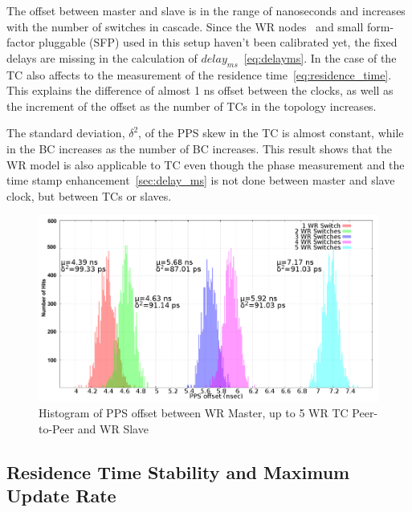 %
The offset between master and slave is in the range of nanoseconds and
increases with the number of switches in cascade. Since the WR nodes~\cite{biblio:wr_gsi} 
and small form-factor pluggable (SFP) used in this setup haven't been calibrated yet, 
the fixed delays are missing in the
calculation of $delay_{ms}$~\eqref{eq:delayms}. In the case of the TC also
affects to the measurement of the residence time~\eqref{eq:residence_time}. This
explains the difference of almost 1 ns offset between the clocks, as well as
the increment of the offset as the number of TCs in the topology increases.

The standard deviation, $\delta^2$, of the PPS skew in the TC is almost constant, 
while in the BC increases as the number of BC increases. 
This result shows that the WR model is also applicable to TC even though the
phase measurement and the time stamp enhancement~\ref{sec:delay_ms} is not done between master and
slave clock, but between TCs or slaves. 

\FloatBarrier
\begin{figure}[!t]
\centering
\includegraphics[scale=0.29]{fig/p2p.png}
\caption{Histogram of PPS offset between WR Master, up to 5 WR TC Peer-to-Peer and WR Slave}
\label{fig:wr_p2p}
\end{figure}

\subsection{Residence Time Stability and Maximum Update Rate}

